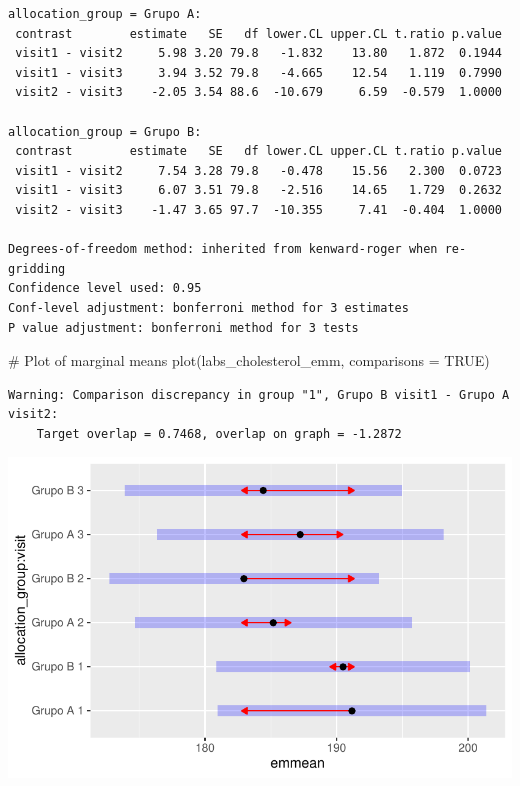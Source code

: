 \documentclass[
  letterpaper,
  DIV=11,
  numbers=noendperiod]{scrartcl}
\newenvironment{Shaded}{\begin{snugshade}}{\end{snugshade}}
\newcommand{\AttributeTok}[1]{\textcolor[rgb]{0.40,0.45,0.13}{#1}}
\newcommand{\CommentTok}[1]{\textcolor[rgb]{0.37,0.37,0.37}{#1}}
\newcommand{\ConstantTok}[1]{\textcolor[rgb]{0.56,0.35,0.01}{#1}}
\newcommand{\FunctionTok}[1]{\textcolor[rgb]{0.28,0.35,0.67}{#1}}
\newcommand{\NormalTok}[1]{\textcolor[rgb]{0.00,0.23,0.31}{#1}}
\begin{document}
\begin{verbatim}
allocation_group = Grupo A:
 contrast        estimate   SE   df lower.CL upper.CL t.ratio p.value
 visit1 - visit2     5.98 3.20 79.8   -1.832    13.80   1.872  0.1944
 visit1 - visit3     3.94 3.52 79.8   -4.665    12.54   1.119  0.7990
 visit2 - visit3    -2.05 3.54 88.6  -10.679     6.59  -0.579  1.0000

allocation_group = Grupo B:
 contrast        estimate   SE   df lower.CL upper.CL t.ratio p.value
 visit1 - visit2     7.54 3.28 79.8   -0.478    15.56   2.300  0.0723
 visit1 - visit3     6.07 3.51 79.8   -2.516    14.65   1.729  0.2632
 visit2 - visit3    -1.47 3.65 97.7  -10.355     7.41  -0.404  1.0000

Degrees-of-freedom method: inherited from kenward-roger when re-gridding 
Confidence level used: 0.95 
Conf-level adjustment: bonferroni method for 3 estimates 
P value adjustment: bonferroni method for 3 tests 
\end{verbatim}

\begin{Shaded}
\begin{Highlighting}[]
\CommentTok{\# Plot of marginal means}
\FunctionTok{plot}\NormalTok{(labs\_cholesterol\_emm, }\AttributeTok{comparisons =} \ConstantTok{TRUE}\NormalTok{)}
\end{Highlighting}
\end{Shaded}

\begin{verbatim}
Warning: Comparison discrepancy in group "1", Grupo B visit1 - Grupo A visit2:
    Target overlap = 0.7468, overlap on graph = -1.2872
\end{verbatim}

\includegraphics{Outcomes_V1V2V3_files/figure-pdf/labs_cholesterol_sens_emm-1.pdf}
\end{document}
